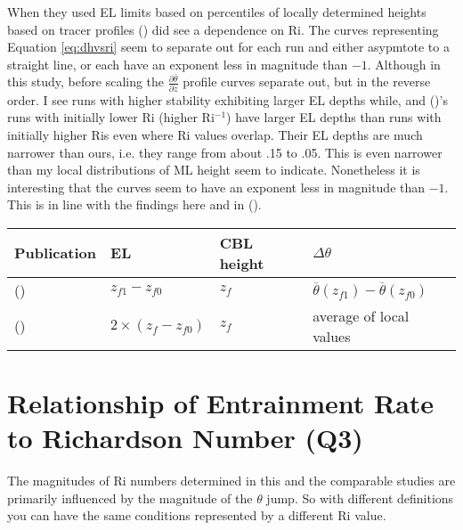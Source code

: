 When they used \acs{EL} limits based on percentiles of locally determined heights based on tracer profiles  \citeauthor{BrooksFowler2} (\citeyear{BrooksFowler2}) did see a dependence on \acs{Ri}.  The curves representing Equation \ref{eq:dhvsri} seem to separate out for each run and either asypmtote to a straight line, or each have an exponent less in magnitude than $-1$.  Although in this study, before scaling the $\frac{\partial \overline{\theta}}{\partial z}$ profile curves separate out, but in the reverse order.  I see runs with higher stability exhibiting larger \acs{EL} depths while, and \citeauthor{BrooksFowler2} (\citeyear{BrooksFowler2})'s runs with initially lower \acs{Ri} (higher \acs{Ri}$^{-1}$) have larger \acs{EL} depths than runs with initially higher \acs{Ri}s even where \acs{Ri} values overlap.  Their \acs{EL} depths are much narrower than ours, i.e. they range from about .15 to .05.  This is even narrower than my local distributions of \acs{ML} height seem to indicate.  Nonetheless it is interesting that the curves seem to have an exponent less in magnitude than $-1$.  This is in line with the findings here and in \citeauthor{FedConzMir04} (\citeyear{FedConzMir04}).\\ 

\begin{table}[htbp]
\begin{center}
\begin{tabular}{ p{5cm} p{4cm} p{2cm} p{2cm}}
Publication & \acs{EL} & \acs{CBL} height & $\Delta \theta$\\ \hline
\citeauthor{FedConzMir04} (\citeyear{FedConzMir04}) & $z_{f1} - z_{f0}$ & $z_{f}$ &  $\overline{\theta}(z_{f1})-\overline{\theta}(z_{f0})$\\ [.3cm] %
\citeauthor{BrooksFowler2} (\citeyear{BrooksFowler2}) & $2 \times (z_{f} - z_{f0})$ & $z_{f}$ & average of local values\\ \hline
\end{tabular}
\end{center}    
\end{table}


\section{Relationship of Entrainment Rate to Richardson Number (Q3)}

The magnitudes of \acs{Ri} numbers determined in this and the comparable studies are primarily influenced by the magnitude of the $\theta$ jump. So with different definitions you can have the same conditions represented by a different \acs{Ri} value.\\

